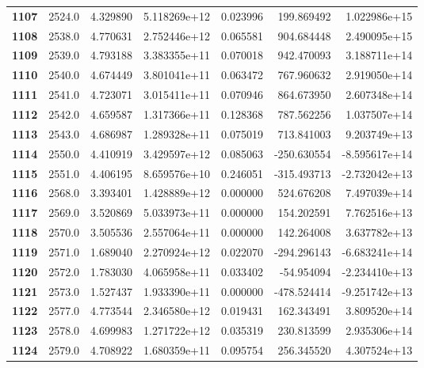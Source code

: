 \documentclass{report}[12pt]
\begin{document}
\begin{center}
\begin{tabular}{lrrrrrr}
\textbf{1107} &         2524.0 &   4.329890 &  5.118269e+12 &    0.023996 &   199.869492 &  1.022986e+15 \\
\textbf{1108} &         2538.0 &   4.770631 &  2.752446e+12 &    0.065581 &   904.684448 &  2.490095e+15 \\
\textbf{1109} &         2539.0 &   4.793188 &  3.383355e+11 &    0.070018 &   942.470093 &  3.188711e+14 \\
\textbf{1110} &         2540.0 &   4.674449 &  3.801041e+11 &    0.063472 &   767.960632 &  2.919050e+14 \\
\textbf{1111} &         2541.0 &   4.723071 &  3.015411e+11 &    0.070946 &   864.673950 &  2.607348e+14 \\
\textbf{1112} &         2542.0 &   4.659587 &  1.317366e+11 &    0.128368 &   787.562256 &  1.037507e+14 \\
\textbf{1113} &         2543.0 &   4.686987 &  1.289328e+11 &    0.075019 &   713.841003 &  9.203749e+13 \\
\textbf{1114} &         2550.0 &   4.410919 &  3.429597e+12 &    0.085063 &  -250.630554 & -8.595617e+14 \\
\textbf{1115} &         2551.0 &   4.406195 &  8.659576e+10 &    0.246051 &  -315.493713 & -2.732042e+13 \\
\textbf{1116} &         2568.0 &   3.393401 &  1.428889e+12 &    0.000000 &   524.676208 &  7.497039e+14 \\
\textbf{1117} &         2569.0 &   3.520869 &  5.033973e+11 &    0.000000 &   154.202591 &  7.762516e+13 \\
\textbf{1118} &         2570.0 &   3.505536 &  2.557064e+11 &    0.000000 &   142.264008 &  3.637782e+13 \\
\textbf{1119} &         2571.0 &   1.689040 &  2.270924e+12 &    0.022070 &  -294.296143 & -6.683241e+14 \\
\textbf{1120} &         2572.0 &   1.783030 &  4.065958e+11 &    0.033402 &   -54.954094 & -2.234410e+13 \\
\textbf{1121} &         2573.0 &   1.527437 &  1.933390e+11 &    0.000000 &  -478.524414 & -9.251742e+13 \\
\textbf{1122} &         2577.0 &   4.773544 &  2.346580e+12 &    0.019431 &   162.343491 &  3.809520e+14 \\
\textbf{1123} &         2578.0 &   4.699983 &  1.271722e+12 &    0.035319 &   230.813599 &  2.935306e+14 \\
\textbf{1124} &         2579.0 &   4.708922 &  1.680359e+11 &    0.095754 &   256.345520 &  4.307524e+13 \\

\end{tabular}
\end{center}
\end{document}
